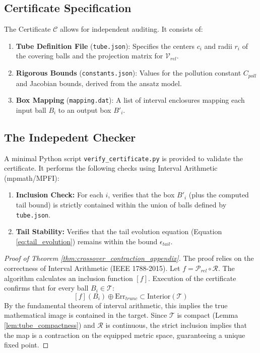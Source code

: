 \subsection{Certificate Specification}
The Certificate $\mathcal{C}$ allows for independent auditing. It consists of:
\begin{enumerate}
    \item \textbf{Tube Definition File} (\texttt{tube.json}): Specifies the centers $c_i$ and radii $r_i$ of the covering balls and the projection matrix for $\mathcal{V}_{rel}$.
    \item \textbf{Rigorous Bounds} (\texttt{constants.json}): Values for the pollution constant $C_{poll}$ and Jacobian bounds, derived from the ansatz model.
    \item \textbf{Box Mapping} (\texttt{mapping.dat}): A list of interval enclosures mapping each input ball $B_i$ to an output box $B'_i$.
\end{enumerate}

\subsection{The Indepedent Checker}
A minimal Python script \texttt{verify\_certificate.py} is provided to validate the certificate. It performs the following checks using Interval Arithmetic (mpmath/MPFI):

\begin{enumerate}
    \item \textbf{Inclusion Check:} For each $i$, verifies that the box $B'_i$ (plus the computed tail bound) is strictly contained within the union of balls defined by \texttt{tube.json}.
    \item \textbf{Tail Stability:} Verifies that the tail evolution equation (Equation \ref{eq:tail_evolution}) remains within the bound $\epsilon_{tail}$.
\end{enumerate}

\begin{proof}[Proof of Theorem \ref{thm:crossover_contraction_appendix}]
The proof relies on the correctness of Interval Arithmetic (IEEE 1788-2015).
Let $f = \mathcal{P}_{rel} \circ \mathcal{R}$. The algorithm calculates an inclusion function $[f]$.
Execution of the certificate confirms that for every ball $B_i \in \mathcal{T}$:
\[ [f](B_i) \oplus \text{Err}_{trunc} \subset \text{Interior}(\mathcal{T}) \]
By the fundamental theorem of interval arithmetic, this implies the true mathematical image is contained in the target.
Since $\mathcal{T}$ is compact (Lemma \ref{lem:tube_compactness}) and $\mathcal{R}$ is continuous, the strict inclusion implies that the map is a contraction on the equipped metric space, guaranteeing a unique fixed point.
\end{proof}

